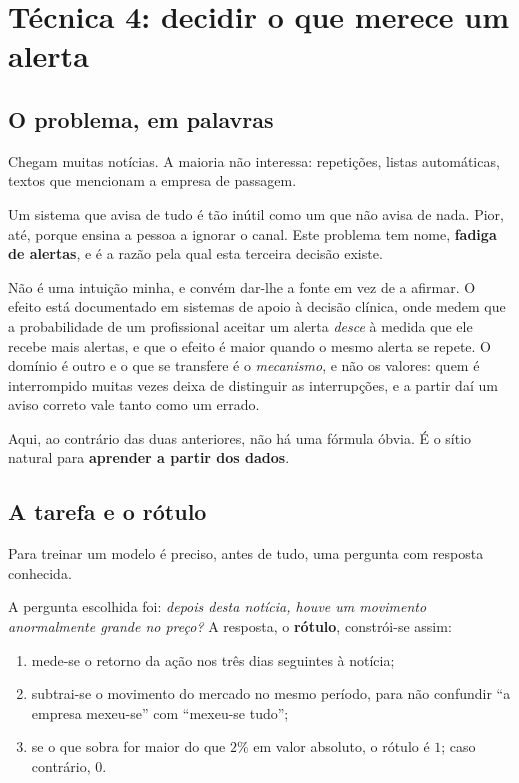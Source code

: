 \section{Técnica 4: decidir o que merece um alerta}
\label{sec:met_triagem}

\subsection{O problema, em palavras}

Chegam muitas notícias. A maioria não interessa: repetições, listas automáticas, textos que
mencionam a empresa de passagem.

Um sistema que avisa de tudo é tão inútil como um que não avisa de nada. Pior, até, porque ensina
a pessoa a ignorar o canal. Este problema tem nome, \textbf{fadiga de alertas}, e é a razão pela
qual esta terceira decisão existe.

Não é uma intuição minha, e convém dar-lhe a fonte em vez de a afirmar. O efeito está documentado
em sistemas de apoio à decisão clínica, onde \textcite{ancker2017alertfatigue} medem que a probabilidade de um profissional aceitar um alerta \emph{desce} à medida que ele
recebe mais alertas, e que o efeito é maior quando o mesmo alerta se repete. O domínio é outro e o
que se transfere é o \emph{mecanismo}, e não os valores: quem é interrompido muitas vezes deixa de
distinguir as interrupções, e a partir daí um aviso correto vale tanto como um errado.

Aqui, ao contrário das duas anteriores, não há uma fórmula óbvia. É o sítio natural para
\textbf{aprender a partir dos dados}.

\subsection{A tarefa e o rótulo}

Para treinar um modelo é preciso, antes de tudo, uma pergunta com resposta conhecida.

A pergunta escolhida foi: \emph{depois desta notícia, houve um movimento anormalmente grande no
preço?} A resposta, o \textbf{rótulo}, constrói-se assim:

\begin{enumerate}
  \item mede-se o retorno da ação nos três dias seguintes à notícia;
  \item subtrai-se o movimento do mercado no mesmo período, para não confundir ``a empresa mexeu-se''
        com ``mexeu-se tudo'';
  \item se o que sobra for maior do que $2\%$ em valor absoluto, o rótulo é $1$; caso contrário, $0$.
\end{enumerate}

